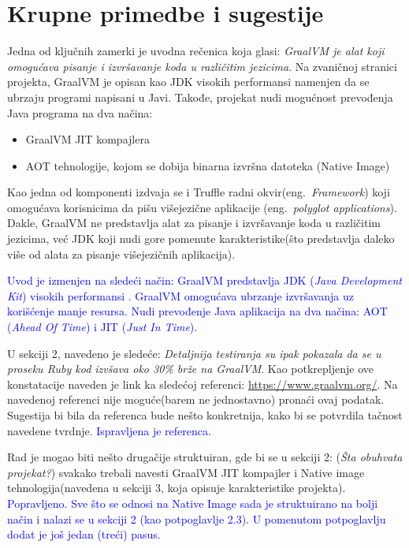 \documentclass[a4paper]{report}
\newcommand{\odgovor}[1]{\textcolor{blue}{#1}}
\begin{document}
\section{Krupne primedbe i sugestije}
Jedna od ključnih zamerki je uvodna rečenica koja glasi: \textit{GraalVM je alat koji omogućava pisanje i izvršavanje koda u različitim
jezicima}. Na zvaničnoj stranici projekta, GraalVM je opisan kao JDK visokih performansi namenjen da se ubrzaju programi napisani u Javi.
Takođe, projekat nudi mogućnost prevođenja Java programa na dva načina:
\begin{itemize}
    \item GraalVM JIT kompajlera
    \item AOT tehnologije, kojom se dobija binarna izvršna datoteka (Native Image)
\end{itemize}
Kao jedna od komponenti izdvaja se i Truffle radni okvir(eng.~{\em Framework}) koji omogućava korisnicima da pišu višejezične aplikacije 
(eng.~{\em polyglot applications}). 
Dakle, GraalVM ne predstavlja alat za pisanje i izvršavanje koda u različitim jezicima, već JDK koji nudi gore pomenute karakteristike(što 
predstavlja daleko više od alata za pisanje višejezičnih aplikacija).

\odgovor{
Uvod je izmenjen na sledeći način:
GraalVM predstavlja JDK (\emph{Java Development Kit}) visokih performansi \cite{graalvmintroduction}. GraalVM omogućava ubrzanje izvršavanja uz korišćenje manje resursa. Nudi prevođenje Java aplikacija na dva načina: AOT (\emph{Ahead Of Time}) i JIT (\emph{Just In Time}).
}

U sekciji 2, navedeno je sledeće: \textit{Detaljnija testiranja su ipak pokazala da se u proseku Ruby kod izvšava oko 30\% brže na GraalVM}. 
Kao potkrepljenje ove konstatacije naveden je link ka sledećoj referenci: \href{https://www.graalvm.org/}{https://www.graalvm.org/}. Na 
navedenoj referenci nije moguće(barem ne jednostavno) pronaći ovaj podatak. Sugestija bi bila da referenca bude nešto konkretnija, kako bi se 
potvrdila tačnost navedene tvrdnje. 
\odgovor{Ispravljena je referenca.}

Rad je mogao biti nešto drugačije struktuiran, gde bi se u sekciji 2: (\textit{Šta obuhvata projekat?}) svakako trebali navesti GraalVM JIT 
kompajler i Native image tehnologija(navedena u sekciji 3, koja opisuje karakteristike projekta). 
\odgovor{Popravljeno. Sve što se odnosi na Native Image sada je struktuirano na bolji način i nalazi se u sekciji 2 (kao potpoglavlje 2.3). U pomenutom potpoglavlju dodat je još jedan (treći) pasus.}
\end{document}
